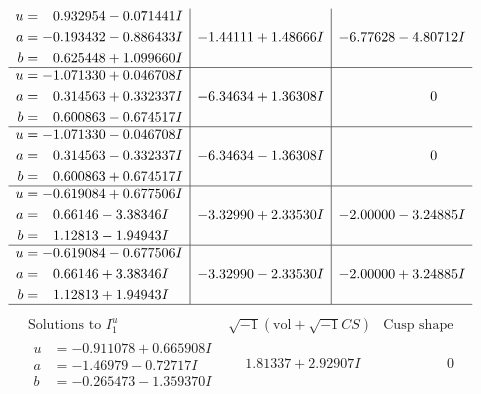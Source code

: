 \documentclass[1p]{elsarticle_modified}
\theoremstyle{definition}
\newcommand{\I}{\sqrt{-1}}
\begin{document}
$$\begin{array}{c|c|c}
\begin{aligned}
u &= \phantom{-}0.932954 - 0.071441 I \\
a &= -0.193432 - 0.886433 I \\
b &= \phantom{-}0.625448 + 1.099660 I\end{aligned}
 & -1.44111 + 1.48666 I & -6.77628 - 4.80712 I \\ \hline\begin{aligned}
u &= -1.071330 + 0.046708 I \\
a &= \phantom{-}0.314563 + 0.332337 I \\
b &= \phantom{-}0.600863 - 0.674517 I\end{aligned}
 & -6.34634 + 1.36308 I & \phantom{-0.000000 } 0 \\ \hline\begin{aligned}
u &= -1.071330 - 0.046708 I \\
a &= \phantom{-}0.314563 - 0.332337 I \\
b &= \phantom{-}0.600863 + 0.674517 I\end{aligned}
 & -6.34634 - 1.36308 I & \phantom{-0.000000 } 0 \\ \hline\begin{aligned}
u &= -0.619084 + 0.677506 I \\
a &= \phantom{-}0.66146 - 3.38346 I \\
b &= \phantom{-}1.12813 - 1.94943 I\end{aligned}
 & -3.32990 + 2.33530 I & -2.00000 - 3.24885 I \\ \hline\begin{aligned}
u &= -0.619084 - 0.677506 I \\
a &= \phantom{-}0.66146 + 3.38346 I \\
b &= \phantom{-}1.12813 + 1.94943 I\end{aligned}
 & -3.32990 - 2.33530 I & -2.00000 + 3.24885 I\\
 \hline 
 \end{array}$$\newpage$$\begin{array}{c|c|c}  
\text{Solutions to }I^u_{1}& \I (\text{vol} + \sqrt{-1}CS) & \text{Cusp shape}\\
 \hline 
\begin{aligned}
u &= -0.911078 + 0.665908 I \\
a &= -1.46979 - 0.72717 I \\
b &= -0.265473 - 1.359370 I\end{aligned}
 & \phantom{-}1.81337 + 2.92907 I & \phantom{-0.000000 } 0 \\ \hline\begin{aligned}

\end{aligned}
\end{array}$$
\end{document}
